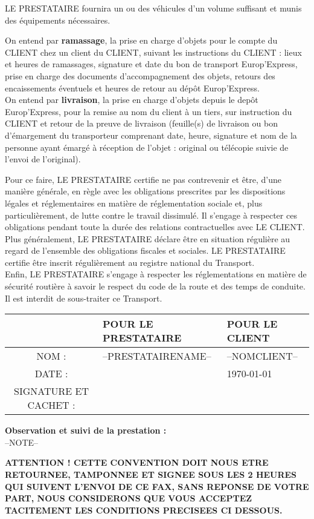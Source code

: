 \documentclass[a4paper, oneside, 8pt, french]{article}
\begin{document}
LE PRESTATAIRE fournira un ou des véhicules d'un volume suffisant et munis des équipements nécessaires.

On entend par \textbf{ramassage}, la prise en charge d'objets pour le compte du CLIENT chez un client du CLIENT, suivant les instructions du CLIENT : lieux et heures de ramassages, signature et date du bon de transport Europ'Express, prise en charge des documents d'accompagnement des objets, retours des encaissements éventuels et heures de retour au dépôt Europ'Express.\\
On entend par \textbf{livraison}, la prise en charge d'objets depuis le depôt Europ'Express, pour la remise au nom du client à un tiers, sur instruction du CLIENT et retour de la preuve de livraison (feuille(s) de livraison ou bon d'émargement du transporteur comprenant date, heure, signature et nom de la personne ayant émargé à réception de l'objet : original ou télécopie suivie de l'envoi de l'original).

Pour ce faire, LE PRESTATAIRE certifie ne pas contrevenir et être, d'une manière générale, en règle avec les obligations prescrites par les dispositions légales et réglementaires en matière de réglementation sociale et, plus particulièrement, de lutte contre le travail dissimulé. Il s'engage à respecter ces obligations pendant toute la durée des relations contractuelles avec LE CLIENT. Plus généralement, LE PRESTATAIRE déclare être en situation régulière au regard de l'ensemble des obligations fiscales et sociales. LE PRESTATAIRE certifie être inscrit régulièrement au registre national du Transport.\\
Enfin, LE PRESTATAIRE s'engage à respecter les réglementations en matière de sécurité routière à savoir le respect du code de la route et des temps de conduite.\\
Il est interdit de sous-traiter ce Transport.

\begin{center}
\begin{tabular}{|c|p{6cm}|p{6cm}|}
\hline 
 & POUR LE PRESTATAIRE & POUR LE CLIENT \\ 
\hline
 NOM : & --PRESTATAIRENAME-- & --NOMCLIENT-- \\ 
\hline
DATE : &  & \today \\ 
\hline
SIGNATURE ET CACHET : &  &  
\\ [1cm]
\hline 
\end{tabular} 
\end{center}

\begin{fminipage}
\textbf{Observation et suivi de la prestation :} \\ 
--NOTE--
\end{fminipage}

\textbf{ATTENTION ! CETTE CONVENTION DOIT NOUS ETRE RETOURNEE, TAMPONNEE ET SIGNEE SOUS LES 2 HEURES QUI SUIVENT L'ENVOI DE CE FAX, SANS REPONSE DE VOTRE PART, NOUS CONSIDERONS QUE VOUS ACCEPTEZ TACITEMENT LES CONDITIONS PRECISEES CI DESSOUS.}
\end{document}
